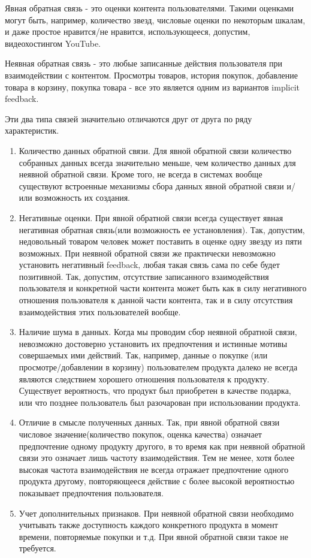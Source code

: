 \documentclass[14pt]{mmcs_article}
\newenvironment{myenumerate}
{ \begin{enumerate}
		\setlength{\itemsep}{0pt}
		\setlength{\parskip}{0pt}
		\setlength{\parsep}{0pt}     }
	{ \end{enumerate}                  }
\begin{document}
Явная обратная связь - это оценки контента пользователями. Такими оценками могут быть, например, количество звезд, числовые оценки по некоторым шкалам, и даже простое нравится/не нравится, использующееся, допустим, видеохостингом YouTube.

Неявная обратная связь - это любые записанные действия пользователя при взаимодействии с контентом. Просмотры товаров, история покупок, добавление товара в корзину, покупка товара - все это является одним из вариантов implicit feedback. 

Эти два типа связей значительно отличаются друг от друга по ряду характеристик.
\begin{myenumerate}
	\item Количество данных обратной связи. Для явной обратной связи количество собранных данных всегда значительно меньше, чем количество данных для неявной обратной связи. Кроме того, не всегда в системах вообще существуют встроенные механизмы  сбора данных явной обратной связи и/или возможность их создания. 
	\item Негативные оценки. При явной обратной связи всегда существует явная негативная обратная связь(или возможность ее установления). Так, допустим, недовольный товаром человек может поставить в оценке одну звезду из пяти возможных. При неявной обратной связи же практически невозможно установить негативный feedback, любая такая связь сама по себе будет позитивной. Так, допустим, отсутствие записанного взаимодействия пользователя и конкретной части контента может быть как в силу негативного отношения пользователя к данной части контента, так и в силу отсутствия взаимодействия этих пользователей вообще.  
	\item Наличие шума в данных. Когда мы проводим сбор неявной обратной связи, невозможно достоверно установить их предпочтения и истинные мотивы совершаемых ими действий. Так, например, данные о покупке (или просмотре/добавлении в корзину) пользователем продукта далеко не всегда являются следствием хорошего отношения пользователя к продукту. Существует вероятность, что продукт был приобретен в качестве подарка, или что позднее пользователь был разочарован при использовании продукта.
	\item Отличие в смысле полученных данных. Так, при явной обратной связи числовое значение(количество покупок, оценка качества) означает предпочтение одному продукту другого, в то время как при неявной обратной связи это означает лишь частоту взаимодействия. Тем не менее, хотя более высокая частота взаимодействия не всегда отражает предпочтение одного продукта другому, повторяющееся действие с более высокой вероятностью показывает предпочтения пользователя.
	\item Учет дополнительных признаков. При неявной обратной связи необходимо учитывать также доступность каждого конкретного продукта в момент времени, повторяемые покупки и т.д. При явной обратной связи такое не требуется. 
\end{myenumerate}
\end{document}
